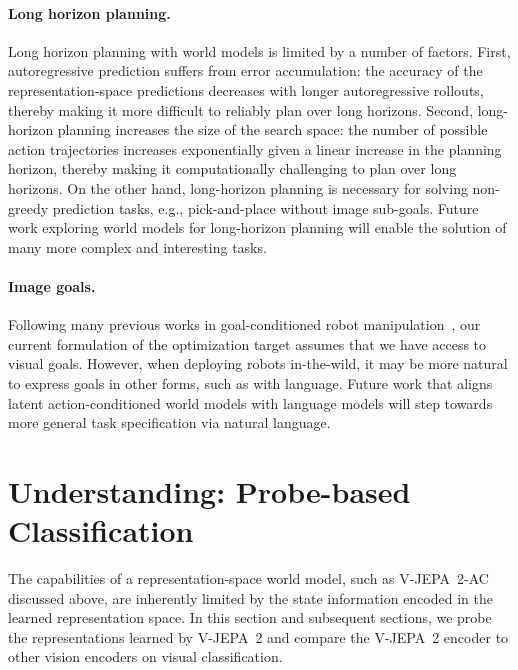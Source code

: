 \documentclass[]{fairmeta}
\newcommand{\model}{V-JEPA~2\xspace}
\newcommand{\acModel}{V-JEPA~2-AC\xspace}
\begin{document}
\paragraph{\bf Long horizon planning.}
Long horizon planning with world models is limited by a number of factors.
First, autoregressive prediction suffers from error accumulation: the accuracy of the representation-space predictions decreases with longer autoregressive rollouts, thereby making it more difficult to reliably plan over long horizons.
Second, long-horizon planning increases the size of the search space: the number of possible action trajectories increases exponentially given a linear increase in the planning horizon, thereby making it computationally challenging to plan over long horizons.
On the other hand, long-horizon planning is necessary for solving non-greedy prediction tasks, e.g., pick-and-place without image sub-goals.
Future work exploring world models for long-horizon planning will enable the solution of many more complex and interesting tasks.

\paragraph{\bf Image goals.}
Following many previous works in goal-conditioned robot manipulation~\citep{finn2017deep, lynch2020learning, chebotar2021actionable, jang2022bc, liu2022masked, gupta2022maskvit}, our current formulation of the optimization target assumes that we have access to visual goals.
However, when deploying robots in-the-wild, it may be more natural to express goals in other forms, such as with language.
Future work that aligns latent action-conditioned world models with language models will step towards more general task specification via natural language.

\section{Understanding: Probe-based Classification}
\label{sec:encoder_comparison}

The capabilities of a representation-space world model, such as \acModel discussed above, are inherently limited by the state information encoded in the learned representation space. In this section and subsequent sections, we probe the representations learned by \model and compare the \model encoder to other vision encoders on visual classification.
\end{document}
